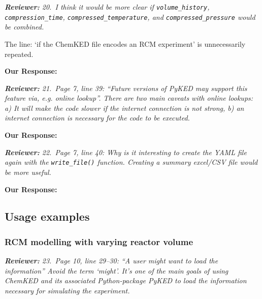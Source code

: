 \documentclass[a4paper,10pt]{elsarticle}
\newenvironment{reviewer}{\vspace{0.5\baselineskip}\begingroup\itshape\textbf{Reviewer:}}{\endgroup\vspace{0.5\baselineskip}}
\newenvironment{response}{\vspace{0.5\baselineskip}\textbf{Our Response:}}{\vspace{0.5\baselineskip}}
\begin{document}
\begin{reviewer}
    20.~I think it would be more clear if \texttt{volume\_history}, \texttt{compression\_time},
    \texttt{compressed\_temperature}, and \texttt{compressed\_pressure} would be combined.

    The line: `if the ChemKED file encodes an RCM experiment' is unnecessarily repeated.
\end{reviewer}

\begin{response}

\end{response}

\begin{reviewer}
    21.~Page 7, line 39: ``Future versions of PyKED may support this feature via, e.g. online
    lookup''. There are two main caveats with online lookups: a) It will make the code slower if the
    internet connection is not strong, b) an internet connection is necessary for the code to be
    executed.
\end{reviewer}

\begin{response}

\end{response}

\begin{reviewer}
    22.~Page 7, line 40: Why is it interesting to create the YAML file again with the
    \texttt{write\_file()} function. Creating a summary excel/CSV file would be more useful.
\end{reviewer}

\begin{response}

\end{response}

\subsection*{Usage examples}
\subsubsection*{RCM modelling with varying reactor volume}

\begin{reviewer}
    23.~Page 10, line 29--30: ``A user might want to load the information'' Avoid the term `might'.
    It's one of the main goals of using ChemKED and its associated Python-package PyKED to load the
    information necessary for simulating the experiment.
\end{reviewer}
\end{document}
